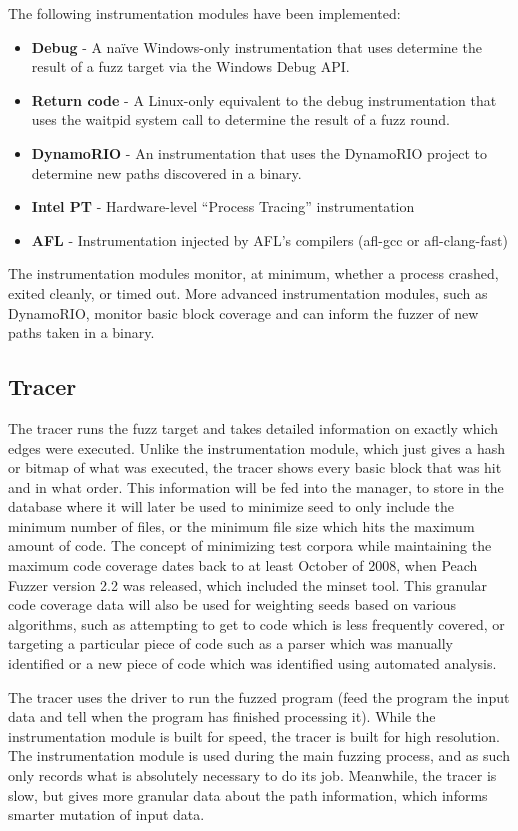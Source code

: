The following instrumentation modules have been implemented:
\begin{itemize}[noitemsep]
\item \textbf{Debug} - A na\"ive Windows-only instrumentation that uses determine the
	result of a fuzz target via the Windows Debug API.
\item \textbf{Return code} - A Linux-only equivalent to the debug instrumentation that
	uses the waitpid system call to determine the result of a fuzz round.
\item \textbf{DynamoRIO} - An instrumentation that uses the DynamoRIO project to
	determine new paths discovered in a binary.
\item \textbf{Intel PT} - Hardware-level ``Process Tracing'' instrumentation
\item \textbf{AFL} - Instrumentation injected by AFL's compilers (afl-gcc or
	afl-clang-fast)
\end{itemize}

The instrumentation modules monitor, at minimum, whether a process crashed,
exited cleanly, or timed out. More advanced instrumentation modules, such as
DynamoRIO, monitor basic block coverage and can inform the fuzzer of new paths
taken in a binary.

\subsection{Tracer} \label{Tracer}
The tracer runs the fuzz target and takes detailed information on exactly which
edges were executed.  Unlike the instrumentation module, which just gives a
hash or bitmap of what was executed, the tracer shows every basic block that
was hit and in what order.  This information will be fed into the manager,
to store in the database where it will later be used to minimize seed to only
include the minimum number of files, or the minimum file size which hits the
maximum amount of code. The concept of minimizing test corpora while
maintaining the maximum code coverage dates back to at least October of 2008,
when Peach Fuzzer version 2.2 was released, which included the minset
tool.\cite{peach22} This granular code coverage data will also be used for
weighting seeds based on various algorithms, such as attempting to get to code
which is less frequently covered, or targeting a particular piece of code such
as a parser which was manually identified or a new piece of code which was
identified using automated analysis.

The tracer uses the driver to run the fuzzed program (feed the program the
input data and tell when the program has finished processing it). While the
instrumentation module is built for speed, the tracer is built for high
resolution.  The instrumentation module is used during the main fuzzing
process, and as such only records what is absolutely necessary to do its job.
Meanwhile, the tracer is slow, but gives more granular data about the path
information, which informs smarter mutation of input data.

